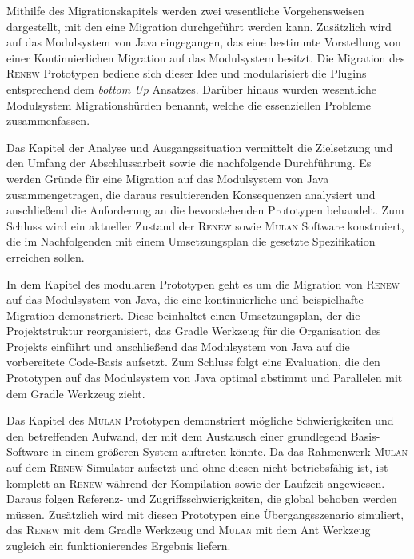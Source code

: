 Mithilfe des Migrationskapitels werden zwei wesentliche Vorgehensweisen dargestellt, mit den eine Migration durchgeführt werden kann. Zusätzlich wird auf das Modulsystem von Java eingegangen, das eine bestimmte Vorstellung von einer Kontinuierlichen Migration auf das Modulsystem besitzt. \newline
Die Migration des \textsc{Renew} Prototypen bediene sich dieser Idee und modularisiert die Plugins entsprechend dem \textit{bottom Up} Ansatzes. Darüber hinaus wurden wesentliche Modulsystem Migrationshürden benannt, welche die essenziellen Probleme zusammenfassen. \bigbreak

Das Kapitel der Analyse und Ausgangssituation vermittelt die Zielsetzung und den Umfang der Abschlussarbeit sowie die nachfolgende Durchführung. Es werden Gründe für eine Migration auf das Modulsystem von Java zusammengetragen, die daraus resultierenden Konsequenzen analysiert und anschließend die Anforderung an die bevorstehenden Prototypen behandelt. Zum Schluss wird ein aktueller Zustand der \textsc{Renew} sowie \textsc{Mulan} Software konstruiert, die im Nachfolgenden mit einem Umsetzungsplan die gesetzte Spezifikation erreichen sollen.\bigbreak

In dem Kapitel des modularen  Prototypen geht es um die Migration von \textsc{Renew} auf das Modulsystem von Java, die eine kontinuierliche und beispielhafte Migration demonstriert. Diese beinhaltet einen Umsetzungsplan, der die Projektstruktur reorganisiert, das Gradle Werkzeug für die Organisation des Projekts einführt und anschließend das Modulsystem von Java auf die vorbereitete Code-Basis aufsetzt. Zum Schluss folgt eine Evaluation, die den Prototypen auf das Modulsystem von Java optimal abstimmt und Parallelen mit dem Gradle Werkzeug zieht.\bigbreak

 Das Kapitel des \textsc{Mulan} Prototypen demonstriert mögliche Schwierigkeiten und den betreffenden Aufwand, der mit dem Austausch einer grundlegend Basis-Software in einem größeren System auftreten könnte. Da das Rahmenwerk \textsc{Mulan} auf dem \textsc{Renew} Simulator aufsetzt und ohne diesen nicht betriebsfähig ist, ist  komplett an \textsc{Renew} während der Kompilation sowie der Laufzeit angewiesen. Daraus folgen Referenz- und Zugriffsschwierigkeiten, die global behoben werden müssen. Zusätzlich wird mit diesen Prototypen eine Übergangsszenario simuliert, das \textsc{Renew} mit dem Gradle Werkzeug und \textsc{Mulan} mit dem Ant Werkzeug zugleich ein funktionierendes Ergebnis liefern. \bigbreak

